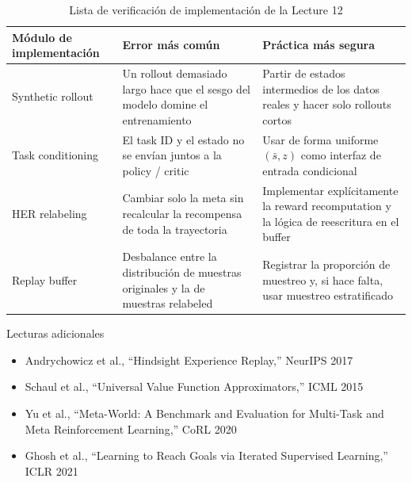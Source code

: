 \documentclass[a4paper]{article}
\begin{document}
\begin{table}[H]
\centering
\begin{tabular}{p{} p{} p{}}
\toprule
Módulo de implementación & Error más común & Práctica más segura \\
\midrule
Synthetic rollout & Un rollout demasiado largo hace que el sesgo del modelo domine el entrenamiento & Partir de estados intermedios de los datos reales y hacer solo rollouts cortos \\
Task conditioning & El task ID y el estado no se envían juntos a la policy / critic & Usar de forma uniforme $(\bar{s}, z)$ como interfaz de entrada condicional \\
HER relabeling & Cambiar solo la meta sin recalcular la recompensa de toda la trayectoria & Implementar explícitamente la reward recomputation y la lógica de reescritura en el buffer \\
Replay buffer & Desbalance entre la distribución de muestras originales y la de muestras relabeled & Registrar la proporción de muestreo y, si hace falta, usar muestreo estratificado \\
\bottomrule
\end{tabular}
\caption{Lista de verificación de implementación de la Lecture 12}
\end{table}

\begin{knowledgebox}{Lecturas adicionales}
\begin{itemize}
    \item Andrychowicz et al., ``Hindsight Experience Replay,'' NeurIPS 2017
    \item Schaul et al., ``Universal Value Function Approximators,'' ICML 2015
    \item Yu et al., ``Meta-World: A Benchmark and Evaluation for Multi-Task and Meta Reinforcement Learning,'' CoRL 2020
    \item Ghosh et al., ``Learning to Reach Goals via Iterated Supervised Learning,'' ICLR 2021
\end{itemize}
\end{knowledgebox}
\end{document}
